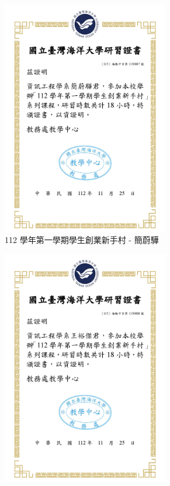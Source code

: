 \begin{figure}[H]
\begin{subfigure}{0.32\linewidth}
    \includegraphics[width=0.8\textwidth]{images/training-2.png}
    \caption{112 學年第一學期學生創業新手村 - 簡蔚驊}
    \label{fig:Training-2}
  \end{subfigure}
  \begin{subfigure}{0.32\linewidth}
    \centering
    \includegraphics[width=0.8\textwidth]{images/training-3.png}

\end{subfigure}
\end{figure}
